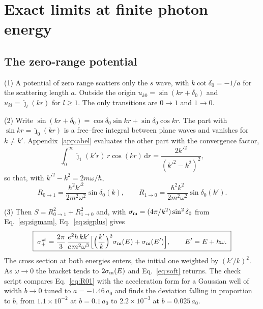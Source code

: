 \documentclass[11pt]{article}
\numberwithin{equation}{section}
\newcommand{\dd}{\mathrm d}
\newcommand{\sm}{\sigma_{\rm m}}
\begin{document}
\section{Exact limits at finite photon energy}
\label{sec:exact}

\subsection{The zero-range potential}
\label{sec:zerorange}
{\noindent}(1) A potential of zero range scatters only the $s$ wave, with
$k\cot\delta_0=-1/a$ for the scattering length $a$. Outside the origin
$u_{k0}=\sin(kr+\delta_0)$ and $u_{kl}=\hat\jmath_l(kr)$ for $l\ge1$. The
only transitions are $0\to1$ and $1\to0$.

{\noindent}(2) Write $\sin(kr+\delta_0)=\cos\delta_0\sin kr+\sin\delta_0\cos kr$.
The part with $\sin kr=\hat\jmath_0(kr)$ is a free--free integral between
plane waves and vanishes for $k\ne k'$. Appendix~\ref{app:abel} evaluates the
other part with the convergence factor,
\begin{equation}
\int_0^\infty\hat\jmath_1(k'r)\,r\cos(kr)\,\dd r=\frac{2k'^2}{(k'^2-k^2)^2},
\label{eq:abel}
\end{equation}
so that, with $k'^2-k^2=2m\omega/\hbar$,
\begin{equation}
R_{0\to1}=\frac{\hbar^2k'^2}{2m^2\omega^2}\sin\delta_0(k),\qquad
R_{1\to0}=\frac{\hbar^2k^2}{2m^2\omega^2}\sin\delta_0(k').
\label{eq:R01}
\end{equation}

{\noindent}(3) Then $S=R_{0\to1}^2+R_{1\to0}^2$ and, with
$\sm=(4\pi/k^2)\sin^2\delta_0$ from Eq.~\eqref{eq:sigmam},
Eq.~\eqref{eq:sigplus} gives
\begin{equation}
\boxed{\;\sigma_+^{\rm zr}=\frac{2\pi}{3}\,\frac{e^2\hbar\,kk'}{c\,m^2\omega^3}
\Big[\Big(\frac{k'}{k}\Big)^2\sm(E)+\sm(E')\Big],\qquad E'=E+\hbar\omega .\;}
\label{eq:twoenergy}
\end{equation}
The cross section at both energies enters, the initial one weighted by
$(k'/k)^2$. As $\omega\to0$ the bracket tends to $2\sm(E)$ and
Eq.~\eqref{eq:soft} returns. The check script compares Eq.~\eqref{eq:R01} with
the acceleration form for a Gaussian well of width $b\to0$ tuned to
$a=-1.46\,a_0$ and finds the deviation falling in proportion to $b$, from
$1.1\times10^{-2}$ at $b=0.1\,a_0$ to $2.2\times10^{-3}$ at $b=0.025\,a_0$.
\end{document}
